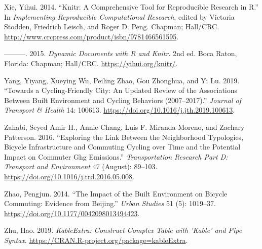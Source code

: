 \documentclass[smallextended]{svjour3}       %
\begin{document}
\leavevmode\hypertarget{ref-Xie2014}{}%
Xie, Yihui. 2014. ``Knitr: A Comprehensive Tool for Reproducible
Research in R.'' In \emph{Implementing Reproducible Computational
Research}, edited by Victoria Stodden, Friedrich Leisch, and Roger D.
Peng. Chapman; Hall/CRC.
\url{http://www.crcpress.com/product/isbn/9781466561595}.

\leavevmode\hypertarget{ref-Xie2015}{}%
---------. 2015. \emph{Dynamic Documents with R and Knitr}. 2nd ed. Boca
Raton, Florida: Chapman; Hall/CRC. \url{https://yihui.org/knitr/}.

\leavevmode\hypertarget{ref-yangCyclingfriendlyCityUpdated2019}{}%
Yang, Yiyang, Xueying Wu, Peiling Zhao, Gou Zhonghua, and Yi Lu. 2019.
``Towards a Cycling-Friendly City: An Updated Review of the Associations
Between Built Environment and Cycling Behaviors (2007--2017).''
\emph{Journal of Transport \& Health} 14: 100613.
\url{https://doi.org/10.1016/j.jth.2019.100613}.

\leavevmode\hypertarget{ref-Zahabi2016}{}%
Zahabi, Seyed Amir H., Annie Chang, Luis F. Miranda-Moreno, and Zachary
Patterson. 2016. ``Exploring the Link Between the Neighborhood
Typologies, Bicycle Infrastructure and Commuting Cycling over Time and
the Potential Impact on Commuter Ghg Emissions.'' \emph{Transportation
Research Part D: Transport and Environment} 47 (August): 89--103.
\url{https://doi.org/10.1016/j.trd.2016.05.008}.

\leavevmode\hypertarget{ref-Zhao2014}{}%
Zhao, Pengjun. 2014. ``The Impact of the Built Environment on Bicycle
Commuting: Evidence from Beijing.'' \emph{Urban Studies} 51 (5):
1019--37. \url{https://doi.org/10.1177/0042098013494423}.

\leavevmode\hypertarget{ref-Zhu2019}{}%
Zhu, Hao. 2019. \emph{KableExtra: Construct Complex Table with 'Kable'
and Pipe Syntax}. \url{https://CRAN.R-project.org/package=kableExtra}.



\end{document}
